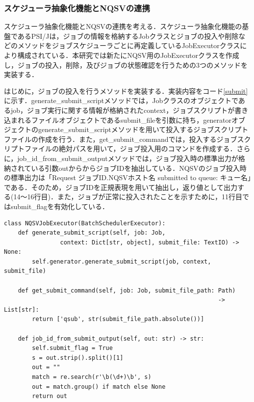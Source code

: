 \subsubsection{スケジューラ抽象化機能とNQSVの連携}
スケジューラ抽象化機能とNQSVの連携を考える．スケジューラ抽象化機能の基盤であるPSI/Jは，ジョブの情報を格納するJobクラスとジョブの投入や削除などのメソッドをジョブスケジューラごとに再定義しているJobExecutorクラスにより構成されている．本研究では新たにNQSV用のJobExecutorクラスを作成し，ジョブの投入，削除，及びジョブの状態確認を行うための3つのメソッドを実装する．\par

はじめに，ジョブの投入を行うメソッドを実装する．実装内容をコード\ref{submit}に示す．generate\_submit\_scriptメソッドでは，Jobクラスのオブジェクトであるjob，ジョブ実行に関する情報が格納されたcontext，ジョブスクリプトが書き込まれるファイルオブジェクトであるsubmit\_fileを引数に持ち，generatorオブジェクトのgenerate\_submit\_scriptメソッドを用いて投入するジョブスクリプトファイルの作成を行う．また，get\_submit\_commandでは，投入するジョブスクリプトファイルの絶対パスを用いて，ジョブ投入用のコマンドを作成する．さらに，job\_id\_from\_submit\_outputメソッドでは，ジョブ投入時の標準出力が格納されている引数outからからジョブIDを抽出している．NQSVのジョブ投入時の標準出力は「Request ジョブID.NQSVホスト名 submitted to queue: キュー名」である．そのため，ジョブIDを正規表現を用いて抽出し，返り値として出力する(14～16行目)．また，ジョブが正常に投入されたことを示すために，11行目ではsubmit\_flagを有効化している．\par

\begin{lstlisting}[caption=ジョブの投入メソッド, label=submit]
class NQSVJobExecutor(BatchSchedulerExecutor):
    def generate_submit_script(self, job: Job, 
                context: Dict[str, object], submit_file: TextIO) -> None:
        self.generator.generate_submit_script(job, context, submit_file)

    def get_submit_command(self, job: Job, submit_file_path: Path)
                                                             -> List[str]:
        return ['qsub', str(submit_file_path.absolute())]

    def job_id_from_submit_output(self, out: str) -> str:
        self.submit_flag = True
        s = out.strip().split()[1]
        out = ""
        match = re.search(r'\b(\d+)\b', s)
        out = match.group() if match else None
        return out
\end{lstlisting}

